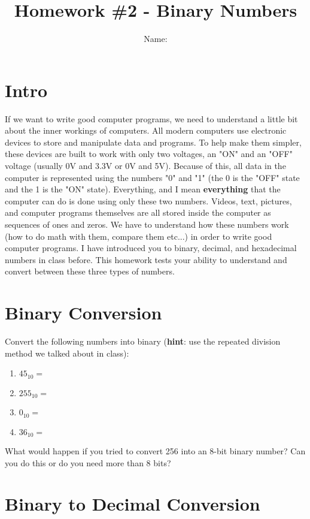 \documentclass[a4paper,12pt]{article} %
\title{\textbf{Homework \#2 - Binary Numbers}}
\author{Name: }
\date{} %
\begin{document}
\maketitle %

\section{Intro}

If we want to write good computer programs, we need to understand a little bit about the inner workings of computers. All modern computers use electronic devices to store and manipulate data and programs. To help make them simpler, these devices are built to work with only two voltages, an "ON" and an "OFF" voltage (usually 0V and 3.3V or 0V and 5V). Because of this, all data in the computer is represented using the numbers "0" and "1" (the 0 is the "OFF" state and the 1 is the "ON" state). Everything, and I mean \textbf{everything} that the computer can do is done using only these two numbers. Videos, text, pictures, and computer programs themselves are all stored inside the computer as sequences of ones and zeros. We have to understand how these numbers work (how to do math with them, compare them etc...) in order to write good computer programs. I have introduced you to binary, decimal, and hexadecimal numbers in class before. This homework tests your ability to understand and convert between these three types of numbers.

\section{Binary Conversion}

Convert the following numbers into binary (\textbf{hint}: use the repeated division method we talked about in class):

\begin{enumerate}
\item $45_{10} = $
\item $255_{10} = $ 
\item $0_{10} = $
\item $36_{10} = $ 
\end{enumerate}

\noindent
What would happen if you tried to convert 256 into an 8-bit binary number? Can you do this or do you need more than 8 bits? 

\section{Binary to Decimal Conversion}
\end{document}
